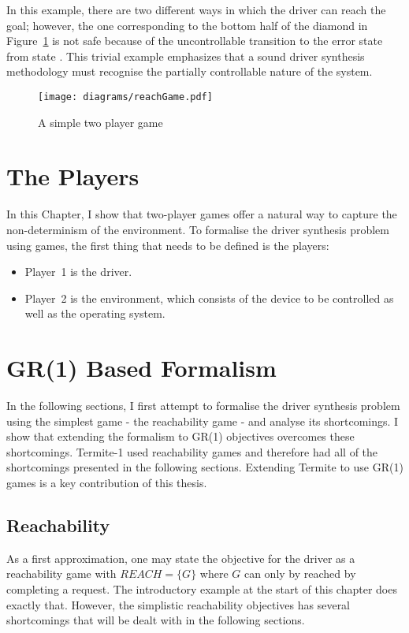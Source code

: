 In this example, there are two different ways in which the driver can reach the goal; however, the one corresponding to the bottom half of the diamond in Figure~\ref{f:game} is not safe because of the uncontrollable transition to the error state from state . This trivial example emphasizes that a sound driver synthesis methodology must recognise the partially controllable nature of the system. 

\begin{figure}
\centering
\texttt{[image: diagrams/reachGame.pdf]}
\caption{A simple two player game}
\label{f:game}
\end{figure}

\section{The Players}
In this Chapter, I show that two-player games offer a natural way to capture the non-determinism of the environment. To formalise the driver synthesis problem using games, the first thing that needs to be defined is the players:

\begin{itemize}
    \item Player~1 is the driver. 
    \item Player~2 is the environment, which consists of the device to be controlled as well as the operating system.
\end{itemize}

\section{GR(1) Based Formalism}
\label{sec:gr1_formalism}

In the following sections, I first attempt to formalise the driver synthesis problem using the simplest game - the reachability game - and analyse its shortcomings. I show that extending the formalism to GR(1) objectives overcomes these shortcomings. Termite-1 used reachability games and therefore had all of the shortcomings presented in the following sections. Extending Termite to use GR(1) games is a key contribution of this thesis.

\subsection{Reachability}

As a first approximation, one may state the objective for the driver as a reachability game with $REACH=\{G\}$ where $G$ can only by reached by completing a request. The introductory example at the start of this chapter does exactly that. However, the simplistic reachability objectives has several shortcomings that will be dealt with in the following sections.

